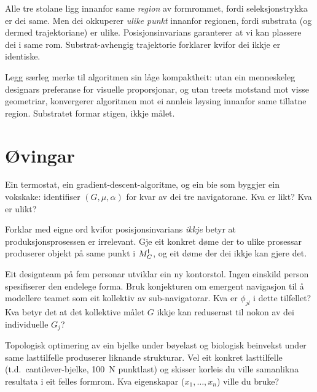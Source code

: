 \medskip
Alle tre stolane ligg innanfor same \emph{region} av formrommet,
fordi seleksjonstrykka er dei same. Men dei okkuperer \emph{ulike
punkt} innanfor regionen, fordi substrata (og dermed
trajektoriane) er ulike. Posisjonsinvarians garanterer at vi kan
plassere dei i same rom. Substrat-avhengig trajektorie forklarer
kvifor dei ikkje er identiske.

Legg særleg merke til algoritmen sin låge kompaktheit: utan ein
menneskeleg designars preferanse for visuelle proporsjonar, og
utan treets motstand mot visse geometriar, konvergerer algoritmen
mot ei annleis løysing innanfor same tillatne region. Substratet
formar stigen, ikkje målet.


\section{Øvingar}

\begin{exercise}[Nivå 1]\label{ex:6.1}
Ein termostat, ein gradient-descent-algoritme, og ein bie som
byggjer ein vokskake: identifiser $(G, \mu, \alpha)$ for kvar av
dei tre navigatorane. Kva er likt? Kva er ulikt?
\end{exercise}

\begin{exercise}[Nivå 1]\label{ex:6.2}
Forklar med eigne ord kvifor posisjonsinvarians \emph{ikkje} betyr
at produksjonsprosessen er irrelevant. Gje eit konkret døme der
to ulike prosessar produserer objekt på same punkt i $M^{\mathsf{I}}_C$, og eit
døme der dei ikkje kan gjere det.
\end{exercise}

\begin{exercise}[Nivå 2]\label{ex:6.3}
Eit designteam på fem personar utviklar ein ny kontorstol. Ingen
einskild person spesifiserer den endelege forma. Bruk konjekturen
om emergent navigasjon til å modellere teamet som eit kollektiv av
sub-navigatorar. Kva er $\phi_{jl}$ i dette tilfellet? Kva
betyr det at det kollektive målet $G$ ikkje kan reduserast til
nokon av dei individuelle $G_j$?
\end{exercise}

\begin{exercise}[Nivå 2]\label{ex:6.4}
Topologisk optimering av ein bjelke under bøyelast og biologisk
beinvekst under same lasttilfelle produserer liknande strukturar.
Vel eit konkret lasttilfelle (t.d.\ cantilever-bjelke, 100~N
punktlast) og skisser korleis du ville samanlikna resultata i eit
felles formrom. Kva eigenskapar ($x_1, \ldots, x_n$) ville du
bruke?
\end{exercise}

